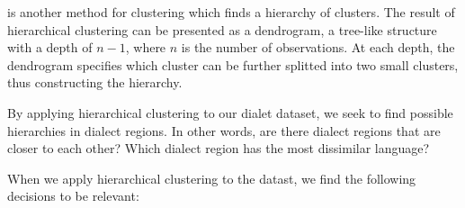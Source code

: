  is another method for clustering which finds a hierarchy of clusters. The result of hierarchical clustering can be presented as a dendrogram, a tree-like structure with a depth of $n-1$, where $n$ is the number of observations. At each depth, the dendrogram specifies which cluster can be further splitted into two small clusters, thus constructing the hierarchy. 

\qquad  By applying hierarchical clustering to our dialet dataset, we seek to find possible hierarchies in dialect regions. In other words, are there dialect regions that are closer to each other? Which dialect region has the most dissimilar language?

\qquad  When we apply hierarchical clustering to the datast, we find the following decisions to be relevant:

